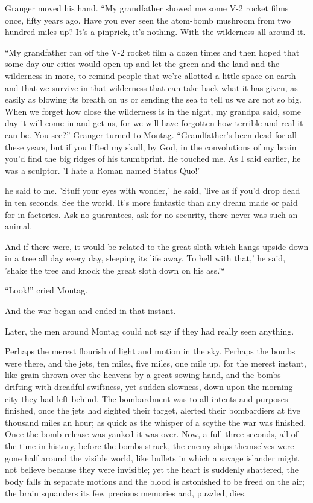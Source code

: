 \documentclass[11pt,openany]{book}
\begin{document}
Granger moved his hand. ``My grandfather showed me some V-2 rocket films once, fifty years ago. Have you ever seen the atom-bomb mushroom from two hundred miles up? It's a pinprick, it's nothing. With the wilderness all around it.

``My grandfather ran off the V-2 rocket film a dozen times and then hoped that some day our cities would open up and let the green and the land and the wilderness in more, to remind people that we're allotted a little space on earth and that we survive in that wilderness that can take back what it has given, as easily as blowing its breath on us or sending the sea to tell us we are not so big. When we forget how close the wilderness is in the night, my grandpa said, some day it will come in and get us, for we will have forgotten how terrible and real it can be. You see?'' Granger turned to Montag. ``Grandfather's been dead for all these years, but if you lifted my skull, by God, in the convolutions of my brain you'd find the big ridges of his thumbprint. He touched me. As I said earlier, he was a sculptor. 'I hate a Roman named Status Quo!'

he said to me. 'Stuff your eyes with wonder,' he said, 'live as if you'd drop dead in ten seconds. See the world. It's more fantastic than any dream made or paid for in factories. Ask no guarantees, ask for no security, there never was such an animal.

And if there were, it would be related to the great sloth which hangs upside down in a tree all day every day, sleeping its life away. To hell with that,' he said, 'shake the tree and knock the great sloth down on his ass.'``

``Look!'' cried Montag.

And the war began and ended in that instant.

Later, the men around Montag could not say if they had really seen anything.

Perhaps the merest flourish of light and motion in the sky. Perhaps the bombs were there, and the jets, ten miles, five miles, one mile up, for the merest instant, like grain thrown over the heavens by a great sowing hand, and the bombs drifting with dreadful swiftness, yet sudden slowness, down upon the morning city they had left behind. The bombardment was to all intents and purposes finished, once the jets had sighted their target, alerted their bombardiers at five thousand miles an hour; as quick as the whisper of a scythe the war was finished. Once the bomb-release was yanked it was over. Now, a full three seconds, all of the time in history, before the bombs struck, the enemy ships themselves were gone half around the visible world, like bullets in which a savage islander might not believe because they were invisible; yet the heart is suddenly shattered, the body falls in separate motions and the blood is astonished to be freed on the air; the brain squanders its few precious memories and, puzzled, dies.
\end{document}
